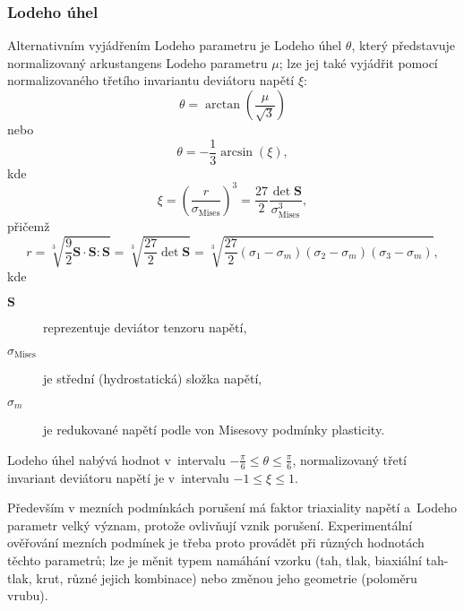 \subsubsection{Lodeho úhel}
Alternativním vyjádřením Lodeho parametru je Lodeho úhel $\theta$,
který představuje normalizovaný arkustangens Lodeho parametru $\mu$;
lze jej také vyjádřit pomocí normalizovaného třetího invariantu deviátoru napětí $\xi$:
\begin{equation}
	\theta = \arctan\left(\frac{\mu}{\sqrt{3}}\right)
\end{equation}
nebo
\begin{equation}
	\theta = -\frac{1}{3}\arcsin\left(\xi\right),
\end{equation}
kde
\begin{equation*}
	\xi = \left(\frac{r}{\sigma_\text{Mises}}\right)^3
	= \frac{27}{2} \frac{\det \bm{S}}{\sigma_\text{Mises}^3},
\end{equation*}
přičemž
\begin{equation*}
	r = \sqrt[3]{\frac{9}{2} \bm{S}\cdot\bm{S}\!:\!\bm{S}}
	= \sqrt[3]{\frac{27}{2} \det\bm{S}}
	= \sqrt[3]{\frac{27}{2} (\sigma_1-\sigma_m)(\sigma_2-\sigma_m)(\sigma_3-\sigma_m)},
\end{equation*}
kde
\begin{description}
	\item[$\bm{S}$] reprezentuje deviátor tenzoru napětí,
	\item[$\sigma_\text{Mises}$] je střední (hydrostatická) složka napětí,
	\item[$\sigma_m$] je redukované napětí podle von Misesovy podmínky plasticity.
\end{description}

Lodeho úhel nabývá hodnot v~intervalu $-\frac{\pi}{6} \leq \theta \leq \frac{\pi}{6}$,
normalizovaný třetí invariant deviátoru napětí je v~intervalu $-1 \leq \xi \leq 1$. 

Především v mezních podmínkách porušení má faktor triaxiality napětí a~Lodeho parametr velký význam, protože ovlivňují vznik porušení.
Experimentální ověřování mezních podmínek je třeba proto provádět při různých hodnotách těchto parametrů;
lze je měnit typem namáhání vzorku (tah, tlak, biaxiální tah-tlak, krut, různé jejich kombinace) nebo změnou jeho geometrie (poloměru vrubu).